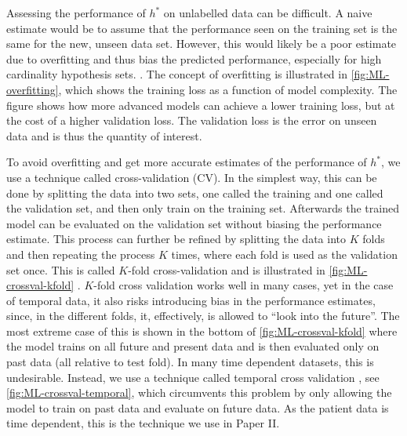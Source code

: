 Assessing the performance of $h^*$ on unlabelled data can be difficult. A naive estimate would be to assume that the performance seen on the training set is the same for the new, unseen data set. However, this would likely be a poor estimate due to overfitting and thus bias the predicted performance, especially for high cardinality hypothesis sets. \autocite{abu-mostafaLearningData2012a}. The concept of overfitting is illustrated in \autoref{fig:ML-overfitting}, which shows the training loss as a function of model complexity. The figure shows how more advanced models can achieve a lower training loss, but at the cost of a higher validation loss. The validation loss is the error on unseen data and is thus the quantity of interest.


To avoid overfitting and get more accurate estimates of the performance of $h^*$, we use a technique called cross-validation (CV). In the simplest way, this can be done by splitting the data into two sets, one called the training and one called the validation set, and then only train on the training set. Afterwards the trained model can be evaluated on the validation set without biasing the performance estimate. This process can further be refined by splitting the data into $K$ folds and then repeating the process $K$ times, where each fold is used as the validation set once.
This is called $K$-fold cross-validation and is illustrated in \autoref{fig:ML-crossval-kfold} \autocite{murphyMachineLearningProbabilistic2012,hastieElementsStatisticalLearning2016}.
$K$-fold cross validation works well in many cases, yet in the case of temporal data, it also risks introducing bias in the performance estimates, since, in the different folds, it, effectively, is allowed to ``look into the future''. The most extreme case of this is shown in the bottom of \autoref{fig:ML-crossval-kfold} where the model trains on all future and present data and is then evaluated only on past data (all relative to test fold). In many time dependent datasets, this is undesirable. Instead, we use a technique called temporal cross validation \autocite{tashmanOutofsampleTestsForecasting2000a}, see \autoref{fig:ML-crossval-temporal}, which circumvents this problem by only allowing the model to train on past data and evaluate on future data. As the patient data is time dependent, this is the technique we use in Paper II.

